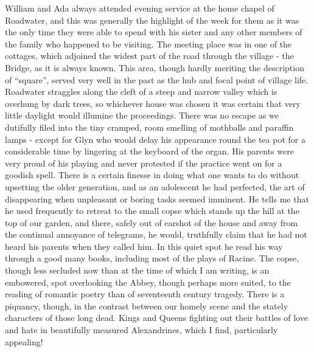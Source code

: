 William and Ada always attended evening service at the home chapel of Roadwater, and this was generally the highlight of the week for them as it was the only time they were able to spend with his sister and any other members of the family who happened to be visiting. The meeting place was in one of the cottages, which adjoined the widest part of the road through the village - the Bridge, as it is always known. This area, though hardly meriting the description of “square”, served very well in the past as the hub and focal point of village life. Roadwater straggles along the cleft of a steep and narrow valley which is overhung by dark trees, so whichever house was chosen it was certain that very little daylight would illumine the proceedings. There was no escape as we dutifully filed into the tiny cramped, room smelling of mothballs and paraffin lamps - except for Glyn who would delay his appearance round the tea pot for a considerable time by lingering at the keyboard of the organ. His parents were very proud of his playing and never protested if the practice went on for a goodish spell. There is a certain finesse in doing what one wants to do without upsetting the older generation, and as an adolescent he had perfected, the art of disappearing when unpleasant or boring tasks seemed imminent. He tells me that he used frequently to retreat to the small copse which stands up the hill at the top of our garden, and there, safely out of earshot of the house and away from the continual annoyance of telegrams, he would, truthfully claim that he had not heard his parents when they called him. In this quiet spot he read his way through a good many books, including most of the plays of Racine. The copse, though less secluded now than at the time of which I am writing, is an embowered, spot overlooking the Abbey, though perhaps more suited, to the reading of romantic poetry than of seventeenth century tragedy. There is a piquancy, though, in the contrast between our homely scene and the stately characters of those long dead. Kings and Queens fighting out their battles of love and hate in beautifully measured Alexandrines, which I find, particularly appealing!

